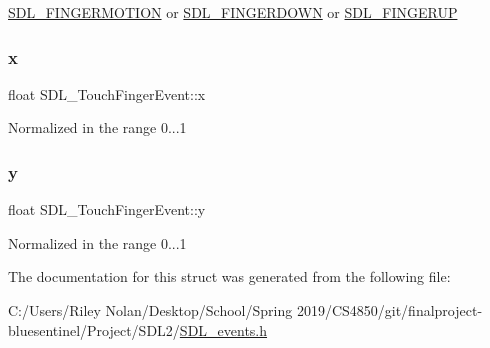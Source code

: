 \mbox{\hyperlink{_s_d_l__events_8h_a3b589e89be6b35c02e0dd34a55f3fccaa1862d7d009ade2c79b2f1fe4a30c9dd2}{S\+D\+L\+\_\+\+F\+I\+N\+G\+E\+R\+M\+O\+T\+I\+ON}} or \mbox{\hyperlink{_s_d_l__events_8h_a3b589e89be6b35c02e0dd34a55f3fccaaa712d1fa8bb69f6042e24a31e835a9ec}{S\+D\+L\+\_\+\+F\+I\+N\+G\+E\+R\+D\+O\+WN}} or \mbox{\hyperlink{_s_d_l__events_8h_a3b589e89be6b35c02e0dd34a55f3fccaa8266a108a628cc698c5172e72c1fc1e6}{S\+D\+L\+\_\+\+F\+I\+N\+G\+E\+R\+UP}} \mbox{\label{struct_s_d_l___touch_finger_event_a0ce44b1342220fa17e9b9b4a77c2c906}} 
\subsubsection{\texorpdfstring{x}{x}}
{\footnotesize\ttfamily float S\+D\+L\+\_\+\+Touch\+Finger\+Event\+::x}

Normalized in the range 0...1 \mbox{\label{struct_s_d_l___touch_finger_event_ac2bb8af638d2927a8e13f6ffe8f9384e}} 
\subsubsection{\texorpdfstring{y}{y}}
{\footnotesize\ttfamily float S\+D\+L\+\_\+\+Touch\+Finger\+Event\+::y}

Normalized in the range 0...1 

The documentation for this struct was generated from the following file\+:\begin{DoxyCompactItemize}
\item 
C\+:/\+Users/\+Riley Nolan/\+Desktop/\+School/\+Spring 2019/\+C\+S4850/git/finalproject-\/bluesentinel/\+Project/\+S\+D\+L2/\mbox{\hyperlink{_s_d_l__events_8h}{S\+D\+L\+\_\+events.\+h}}\end{DoxyCompactItemize}

